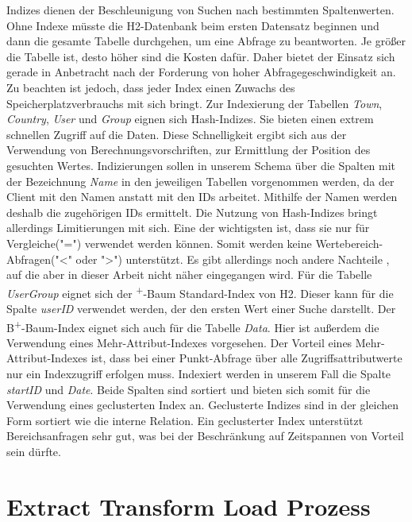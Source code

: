 Indizes dienen der Beschleunigung von Suchen nach bestimmten Spaltenwerten. Ohne Indexe müsste die H2-Datenbank beim ersten Datensatz beginnen und dann die gesamte Tabelle durchgehen, um eine Abfrage zu beantworten. Je größer die Tabelle ist, desto höher sind die Kosten dafür. Daher bietet der Einsatz sich gerade in Anbetracht nach der Forderung von hoher Abfragegeschwindigkeit an. Zu beachten ist jedoch, dass jeder Index einen Zuwachs des Speicherplatzverbrauchs mit sich bringt. Zur Indexierung der Tabellen \textit{Town}, \textit{Country}, \textit{User} und \textit{Group} eignen sich Hash-Indizes. Sie bieten einen extrem schnellen Zugriff auf die Daten. Diese Schnelligkeit ergibt sich aus der Verwendung von Berechnungsvorschriften, zur Ermittlung der Position des gesuchten Wertes. Indizierungen sollen in unserem Schema über die Spalten mit der Bezeichnung \textit{Name} in den jeweiligen Tabellen vorgenommen werden, da der Client mit den Namen anstatt mit den IDs arbeitet. Mithilfe der Namen werden deshalb die zugehörigen IDs ermittelt. Die Nutzung von Hash-Indizes bringt allerdings Limitierungen mit sich. Eine der wichtigsten ist, dass sie nur für Vergleiche("=") verwendet werden können. Somit werden keine Wertebereich-Abfragen("<" oder ">") unterstützt. Es gibt allerdings noch andere Nachteile \cite{SWB-352401869}, auf die aber in dieser Arbeit nicht näher eingegangen wird. 
Für die Tabelle \textit{UserGroup} eignet sich der \textsuperscript{+}-Baum Standard-Index von H2. Dieser kann für die Spalte \textit{userID} verwendet werden, der den ersten Wert einer Suche darstellt. Der B\textsuperscript{+}-Baum-Index eignet sich auch für die Tabelle \textit{Data}. Hier ist außerdem die Verwendung eines Mehr-Attribut-Indexes vorgesehen. Der Vorteil eines Mehr-Attribut-Indexes ist, dass bei einer Punkt-Abfrage über alle Zugriffsattributwerte nur ein Indexzugriff erfolgen muss. Indexiert werden in unserem Fall die Spalte \textit{startID} und \textit{Date}. Beide Spalten sind sortiert und bieten sich somit für die Verwendung eines geclusterten Index an. Geclusterte Indizes sind in der gleichen Form sortiert wie die interne Relation. Ein geclusterter Index unterstützt Bereichsanfragen sehr gut, was bei der Beschränkung auf Zeitspannen von Vorteil sein dürfte.       


\section{Extract Transform Load Prozess}

